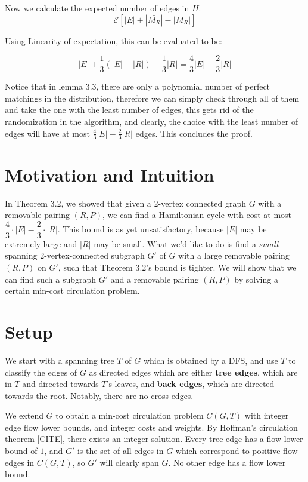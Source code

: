 \documentclass[12pt]{article}
\begin{document}
Now we calculate the expected number of edges in $H$.
\begin{equation}
\mathcal{E}[|E|+|\bar{M_R}|-|M_R|]
\end{equation}

Using Linearity of expectation, this can be evaluated to be:

\begin{equation}
|E| + \frac{1}{3}(|E|-|R|)-\frac{1}{3}|R| = \frac{4}{3}|E|-\frac{2}{3}|R|
\end{equation}

Notice that in lemma 3.3, there are only a polynomial number of perfect matchings in the distribution, therefore we can simply check through all of them and take the one with the least number of edges, this gets rid of the randomization in the algorithm, and clearly, the choice with the least number of edges will have at most $\frac{4}{3}|E|-\frac{2}{3}|R|$ edges. This concludes the proof.


\section{Motivation and Intuition}

In Theorem 3.2, we showed that given a 2-vertex connected graph $G$ with a
removable pairing $(R, P)$, we can find a Hamiltonian cycle with cost at most
$\dfrac{4}{3} \cdot |E| - \dfrac{2}{3} \cdot |R|$.  This bound is as yet
unsatisfactory, because $|E|$ may be extremely large and $|R|$ may be small.
What we'd like to do is find a \emph{small} spanning 2-vertex-connected
subgraph $G'$ of $G$ with a large removable pairing $(R, P)$ on $G'$, such that
Theorem 3.2's bound is tighter.  We will show that we can find such a subgraph
$G'$ and a removable pairing $(R,P)$ by solving a certain min-cost circulation
problem.

\section{Setup}

We start with a spanning tree $T$ of $G$ which is obtained by a DFS, and use
$T$ to classify the edges of $G$ as directed edges which are either {\bf tree
edges}, which are in $T$ and directed towards $T$'s leaves, and {\bf back
edges}, which are directed towards the root.  Notably, there are no cross edges.

We extend $G$ to obtain a min-cost circulation problem $C(G, T)$ with integer
edge flow lower bounds, and integer costs and weights.  By Hoffman's circulation
theorem [CITE], there exists an integer solution. Every tree edge has a
flow lower bound of $1$, and $G'$ is the set of all edges in $G$ which
correspond to positive-flow edges in $C(G,T)$, so $G'$ will clearly span $G$.
No other edge has a flow lower bound.  
\end{document}
